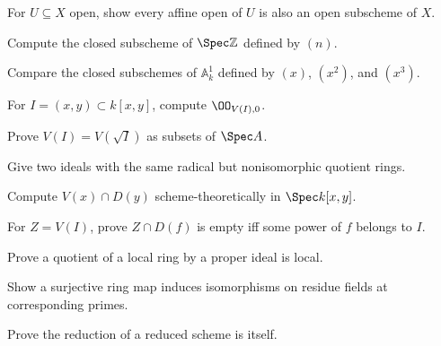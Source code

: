 \begin{exercise}\label{exr:vi22-01}
For $U\subseteq X$ open, show every affine open of $U$ is also an open subscheme of $X$.
\end{exercise}

\begin{exercise}\label{exr:vi22-02}
Compute the closed subscheme of $\Spec\mathbb Z$ defined by $(n)$.
\end{exercise}

\begin{exercise}\label{exr:vi22-03}
Compare the closed subschemes of $\mathbb A^1_k$ defined by $(x)$, $(x^2)$, and $(x^3)$.
\end{exercise}

\begin{exercise}\label{exr:vi22-04}
For $I=(x,y)\subset k[x,y]$, compute $\OO_{V(I),0}$.
\end{exercise}

\begin{exercise}\label{exr:vi22-05}
Prove $V(I)=V(\sqrt I)$ as subsets of $\Spec A$.
\end{exercise}

\begin{exercise}\label{exr:vi22-06}
Give two ideals with the same radical but nonisomorphic quotient rings.
\end{exercise}

\begin{exercise}\label{exr:vi22-07}
Compute $V(x)\cap D(y)$ scheme-theoretically in $\Spec k[x,y]$.
\end{exercise}

\begin{exercise}\label{exr:vi22-08}
For $Z=V(I)$, prove $Z\cap D(f)$ is empty iff some power of $f$ belongs to $I$.
\end{exercise}

\begin{exercise}\label{exr:vi22-09}
Prove a quotient of a local ring by a proper ideal is local.
\end{exercise}

\begin{exercise}\label{exr:vi22-10}
Show a surjective ring map induces isomorphisms on residue fields at corresponding primes.
\end{exercise}

\begin{exercise}\label{exr:vi22-11}
Prove the reduction of a reduced scheme is itself.
\end{exercise}


